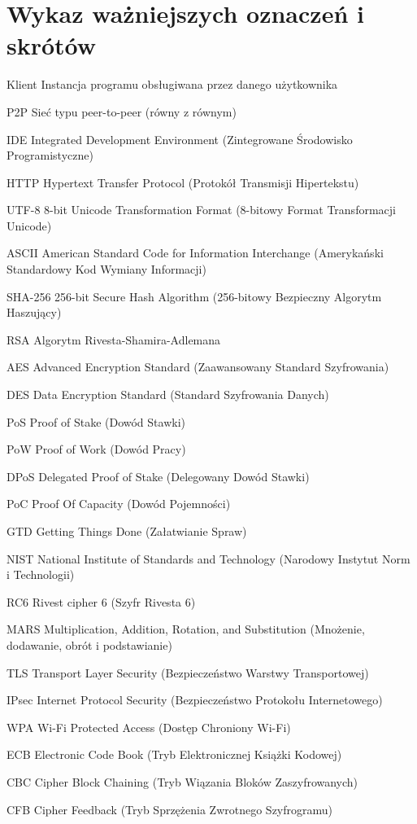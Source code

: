 \chapter*{Wykaz ważniejszych oznaczeń i skrótów}

\begin{abbrev}
\item[Klient] Instancja programu obsługiwana przez danego użytkownika
\item[P2P] Sieć typu peer-to-peer (równy z równym)
\item[IDE] Integrated Development Environment (Zintegrowane Środowisko Programistyczne)
\item[HTTP] Hypertext Transfer Protocol (Protokół Transmisji Hipertekstu)
\item[UTF-8] 8-bit Unicode Transformation Format (8-bitowy Format Transformacji Unicode)
\item[ASCII] American Standard Code for Information Interchange (Amerykański Standardowy Kod Wymiany Informacji)
\item [SHA-256] 256-bit Secure Hash Algorithm (256-bitowy Bezpieczny Algorytm Haszujący)
\item[RSA] Algorytm Rivesta-Shamira-Adlemana
\item[AES] Advanced Encryption Standard (Zaawansowany Standard Szyfrowania)
\item[DES] Data Encryption Standard (Standard Szyfrowania Danych)
\item[PoS] Proof of Stake (Dowód Stawki)
\item[PoW] Proof of Work (Dowód Pracy)
\item[DPoS] Delegated Proof of Stake (Delegowany Dowód Stawki)
\item[PoC] Proof Of Capacity (Dowód Pojemności)
\item[GTD] Getting Things Done (Załatwianie Spraw)
\item[NIST] National Institute of Standards and Technology (Narodowy Instytut Norm i Technologii)
\item[RC6] Rivest cipher 6 (Szyfr Rivesta 6)
\item[MARS] Multiplication, Addition, Rotation, and Substitution  (Mnożenie, dodawanie, obrót i podstawianie)
\item[TLS] Transport Layer Security (Bezpieczeństwo Warstwy Transportowej)
\item[IPsec] Internet Protocol Security (Bezpieczeństwo Protokołu Internetowego)
\item[WPA] Wi-Fi Protected Access (Dostęp Chroniony Wi-Fi)
\item[ECB] Electronic Code Book (Tryb Elektronicznej Książki Kodowej)
\item[CBC] Cipher Block Chaining (Tryb Wiązania Bloków Zaszyfrowanych)
\item[CFB] Cipher Feedback (Tryb Sprzężenia Zwrotnego Szyfrogramu)
\end{abbrev}

